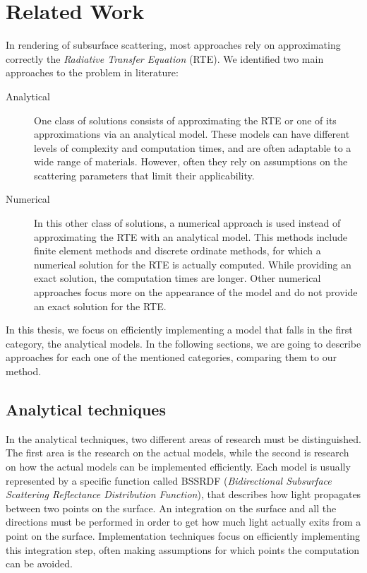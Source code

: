 \chapter{Related Work}
\label{chap:previous}
In rendering of subsurface scattering, most approaches rely on approximating correctly the \emph{Radiative Transfer Equation} (RTE). We identified two main approaches to the problem in literature:

\begin{description}
	\item[Analytical] One class of solutions consists of approximating the RTE or one of its approximations via an analytical model. These models can have different levels of complexity and computation times, and are often adaptable to a wide range of materials. However, often they rely on assumptions on the scattering parameters that limit their applicability.
	\item[Numerical] In this other class of solutions, a numerical approach is used instead of approximating the RTE with an analytical model. This methods include finite element methods and discrete ordinate methods, for which a numerical solution for the RTE is actually computed. While providing an exact solution, the computation times are longer. Other numerical approaches focus more on the appearance of the model and do not provide an exact solution for the RTE.
\end{description}

In this thesis, we focus on efficiently implementing a model that falls in the first category, the analytical models. In the following sections, we are going to describe approaches for each one of the mentioned categories, comparing them to our method.

\section{Analytical techniques}

In the analytical techniques, two different areas of research must be distinguished. The first area is the research on the actual models, while the second is research on how the actual models can be implemented efficiently. Each model is usually represented by a specific function called BSSRDF (\emph{Bidirectional Subsurface Scattering Reflectance Distribution Function}), that describes how light propagates between two points on the surface. An integration on the surface and all the directions must be performed in order to get how much light actually exits from a point on the surface. Implementation techniques focus on efficiently implementing this integration step, often making assumptions for which points the computation can be avoided. 

